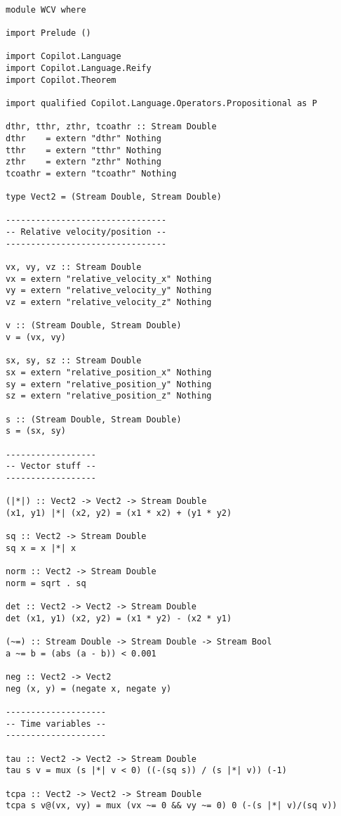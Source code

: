 \begin{lstlisting}[language=Copilot]

module WCV where

import Prelude ()

import Copilot.Language
import Copilot.Language.Reify
import Copilot.Theorem

import qualified Copilot.Language.Operators.Propositional as P

dthr, tthr, zthr, tcoathr :: Stream Double
dthr    = extern "dthr" Nothing
tthr    = extern "tthr" Nothing
zthr    = extern "zthr" Nothing
tcoathr = extern "tcoathr" Nothing

type Vect2 = (Stream Double, Stream Double)

--------------------------------
-- Relative velocity/position --
--------------------------------

vx, vy, vz :: Stream Double
vx = extern "relative_velocity_x" Nothing
vy = extern "relative_velocity_y" Nothing
vz = extern "relative_velocity_z" Nothing

v :: (Stream Double, Stream Double)
v = (vx, vy)

sx, sy, sz :: Stream Double
sx = extern "relative_position_x" Nothing
sy = extern "relative_position_y" Nothing
sz = extern "relative_position_z" Nothing

s :: (Stream Double, Stream Double)
s = (sx, sy)

------------------
-- Vector stuff --
------------------

(|*|) :: Vect2 -> Vect2 -> Stream Double
(x1, y1) |*| (x2, y2) = (x1 * x2) + (y1 * y2)

sq :: Vect2 -> Stream Double
sq x = x |*| x

norm :: Vect2 -> Stream Double
norm = sqrt . sq

det :: Vect2 -> Vect2 -> Stream Double
det (x1, y1) (x2, y2) = (x1 * y2) - (x2 * y1)

(~=) :: Stream Double -> Stream Double -> Stream Bool
a ~= b = (abs (a - b)) < 0.001

neg :: Vect2 -> Vect2
neg (x, y) = (negate x, negate y)

--------------------
-- Time variables --
--------------------

tau :: Vect2 -> Vect2 -> Stream Double
tau s v = mux (s |*| v < 0) ((-(sq s)) / (s |*| v)) (-1)

tcpa :: Vect2 -> Vect2 -> Stream Double
tcpa s v@(vx, vy) = mux (vx ~= 0 && vy ~= 0) 0 (-(s |*| v)/(sq v))


\end{lstlisting}
